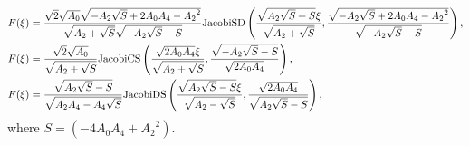 \documentclass[prd,aps,floats,showkeys,nofootinbib,notitlepage]{revtex4-2}
\begin{document}
\begin{subequations}
\begin{align}
			&F(\xi)=  \frac{{\sqrt 2 \sqrt {{A_0}} \sqrt { - {A_2} \sqrt S  + 2 {A_0} {A_4} - {A_2}^2} }}{{\sqrt {{A_2} + \sqrt S } \sqrt { - {A_2} \sqrt S  - S} }}{\text{JacobiSD}}\left( {\frac{{\sqrt {{A_2} \sqrt S  + S} \xi }}{{\sqrt {{A_2} + \sqrt S } }},\frac{{\sqrt { - {A_2} \sqrt S  + 2 {A_0} {A_4} - {A_2}^2} }}{{\sqrt { - {A_2} \sqrt S  - S} }}} \right), \hfill \\
			&F(\xi)=  \frac{{\sqrt 2 \sqrt {{A_0}} }}{{\sqrt {{A_2} + \sqrt S } }}{\text{JacobiCS}}\left( {\frac{{ \sqrt {2{A_0} {A_4}} \xi }}{{\sqrt {{A_2} + \sqrt S } }},\frac{{\sqrt { - {A_2} \sqrt S  - S} }}{{\sqrt {2{A_0} {A_4}} }}} \right), \hfill \\
			&F(\xi)=  \frac{{\sqrt {{A_2} \sqrt S  - S} }}{{\sqrt {{A_2} {A_4} - {A_4} \sqrt S } }}{\text{JacobiDS}}\left( {\frac{{\sqrt {{A_2} \sqrt S  - S} \xi }}{{\sqrt {{A_2} - \sqrt S } }},\frac{{\sqrt {2{A_0} {A_4}} }}{{\sqrt {{A_2} \sqrt S  - S} }}} \right),
		\end{align}
	\end{subequations}
	where $S = \left( { - 4 {A_0} {A_4} + {A_2}^2} \right)$. 
	
\end{document}
